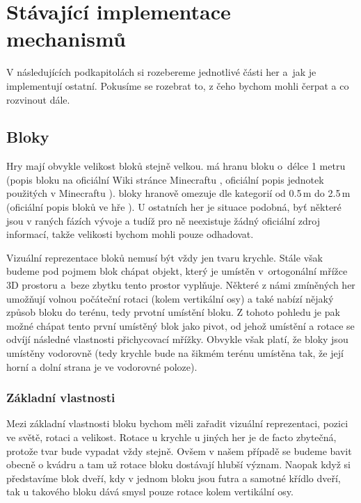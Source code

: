 

\section{Stávající implementace mechanismů}

V následujících podkapitolách si rozebereme jednotlivé části her a~jak je implementují ostatní. Pokusíme se rozebrat to, z čeho bychom mohli čerpat a co rozvinout dále.

\subsection{Bloky}

Hry mají obvykle velikost bloků stejně velkou. \MC{} má hranu bloku o~délce 1 metru (popis bloku na oficiální Wiki stránce Minecraftu \citep{mc_block}, oficiální popis jednotek použitých v Minecraftu \citep{mc_units}). \SE{} bloky hranově omezuje dle kategorií od 0.5\,\rm m do 2.5\,\rm m (oficiální popis bloků ve hře \citep{se_blocks_wiki}). U ostatních her je situace podobná, byť některé jsou v raných fázích vývoje a tudíž pro ně neexistuje žádný oficiální zdroj informací, takže velikosti bychom mohli pouze odhadovat.

Vizuální reprezentace bloků nemusí být vždy jen tvaru krychle. Stále však budeme pod pojmem blok chápat objekt, který je umístěn v~ortogonální mřížce 3D prostoru a~beze zbytku tento prostor vyplňuje. Některé z námi zmíněných her umožňují volnou počáteční rotaci (kolem vertikální osy) a také nabízí nějaký způsob  bloku do terénu, tedy prvotní umístění bloku. Z tohoto pohledu je pak možné chápat tento první umístěný blok jako pivot, od jehož umístění a rotace se odvíjí následné vlastnosti přichycovací mřížky. Obvykle však platí, že bloky jsou umístěny vodorovně (tedy krychle bude na šikmém terénu umístěna tak, že její horní a dolní strana je ve vodorovné poloze).

\subsubsection{Základní vlastnosti}

Mezi základní vlastnosti bloku bychom měli zařadit vizuální reprezentaci, pozici ve světě, rotaci a velikost. Rotace u krychle u jiných her je de facto zbytečná, protože tvar bude vypadat vždy stejně. Ovšem v našem případě se budeme bavit obecně o kvádru a tam už rotace bloku dostávají hlubší význam. Naopak když si představíme blok dveří, kdy v jednom bloku jsou futra a samotné křídlo dveří, tak u takového bloku dává smysl pouze rotace kolem vertikální osy. 

